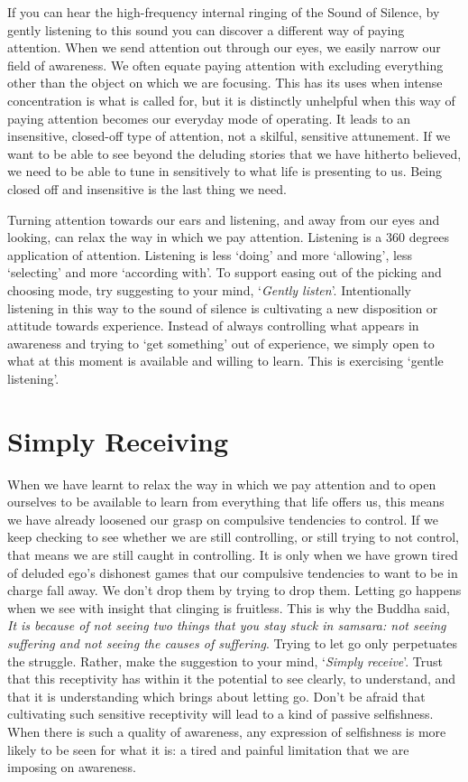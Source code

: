 If you can hear the high-frequency internal ringing of the Sound of
Silence, by gently listening to this sound you can discover a different
way of paying attention. When we send attention out through our eyes, we
easily narrow our field of awareness. We often equate paying attention
with excluding everything other than the object on which we are
focusing. This has its uses when intense concentration is what is called
for, but it is distinctly unhelpful when this way of paying attention
becomes our everyday mode of operating. It leads to an insensitive,
closed-off type of attention, not a skilful, sensitive attunement. If we
want to be able to see beyond the deluding stories that we have hitherto
believed, we need to be able to tune in sensitively to what life is
presenting to us. Being closed off and insensitive is the last thing we
need.

Turning attention towards our ears and listening, and away from our eyes
and looking, can relax the way in which we pay attention. Listening is a
360 degrees application of attention. Listening is less `doing' and more
`allowing', less `selecting' and more `according with'. To support
easing out of the picking and choosing mode, try suggesting to your
mind, `\emph{Gently listen}'. Intentionally listening in this way to the
sound of silence is cultivating a new disposition or attitude towards
experience. Instead of always controlling what appears in awareness and
trying to `get something' out of experience, we simply open to what at
this moment is available and willing to learn. This is exercising
`gentle listening'.

\section{Simply Receiving}

When we have learnt to relax the way in which we pay attention and to
open ourselves to be available to learn from everything that life offers
us, this means we have already loosened our grasp on compulsive
tendencies to control. If we keep checking to see whether we are still
controlling, or still trying to not control, that means we are still
caught in controlling. It is only when we have grown tired of deluded
ego's dishonest games that our compulsive tendencies to want to be in
charge fall away. We don't drop them by trying to drop them. Letting go
happens when we see with insight that clinging is fruitless. This is why
the Buddha said, \emph{It is because of not seeing two things that you
stay stuck in samsara: not seeing suffering and not seeing the causes of
suffering}. Trying to let go only perpetuates the struggle. Rather, make
the suggestion to your mind, `\emph{Simply receive}'. Trust that this
receptivity has within it the potential to see clearly, to understand,
and that it is understanding which brings about letting go. Don't be
afraid that cultivating such sensitive receptivity will lead to a kind
of passive selfishness. When there is such a quality of awareness, any
expression of selfishness is more likely to be seen for what it is: a
tired and painful limitation that we are imposing on awareness.

